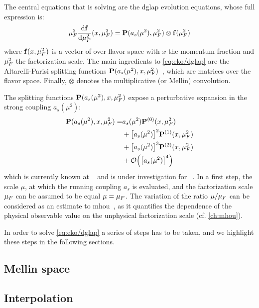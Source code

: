
The central equations that \eko is solving are the \acrfull{dglap} evolution
equations, whose full expression is:
\begin{equation}
	\muF^2 \dv{\vb f}{\muF^2}{}(x,\muF^2) = \vb P (a_s(\mu^2),\muF^2) \otimes \vb f(\muF^2)
	\label{eq:eko/dglap}
\end{equation}
where $\vb f(x,\mu_F^2)$ is a vector of \pdfs over flavor space with $x$ the
momentum fraction and $\mu_F^2$ the factorization scale.
The main ingredients to \cref{eq:eko/dglap} are the Altarelli-Parisi splitting
functions $\vb P(a_s(\mu^2),x,\mu_F^2)$~\cite{Moch:2004pa,Vogt:2004mw}, which
are matrices over the flavor space.
Finally, $\otimes$ denotes the multiplicative (or Mellin) convolution.

The splitting functions $\vb P(a_s(\mu^2),x,\mu_F^2)$ expose a perturbative
expansion in the strong coupling $a_s(\mu^2)$:
\begin{align}
  \vb P(a_s(\mu^2),x,\muF^2) =& a_s(\mu^2) \vb P^{(0)}(x,\muF^2)\nonumber\\
  &+ \qty[a_s(\mu^2)]^2 \vb P^{(1)}(x,\muF^2)\nonumber\\
  &+ \qty[a_s(\mu^2)]^3 \vb P^{(2)}(x,\muF^2)\nonumber\\
  &+ \order{\qty[a_s(\mu^2)]^4}
\end{align}
which is currently known at \nnlo{}~\cite{Moch:2004pa,Vogt:2004mw,Blumlein:2021enk} and is under
investigation for \nnnlo{}~\cite{Moch:2021qrk}.
In a first step, the scale $\mu$, at which the running coupling $a_s$ is
evaluated, and the factorization scale $\mu_F$ can be assumed to be equal $\mu =
\mu_F$.
The variation of the ratio $\mu/\mu_F$ can be considered as an estimate to
\acrfull{mhou}~\cite{AbdulKhalek:2019ihb}, as it quantifies the dependence of
the physical observable value on the unphysical factorization scale (cf.
\cref{ch:mhou}).

In order to solve \cref{eq:eko/dglap} a series of steps has to be taken, and we
highlight these steps in the following sections.

\subsection{Mellin space}
\label{sec:theory:mellin}


\subsection{Interpolation}
\label{sec:theory:interpolation}


